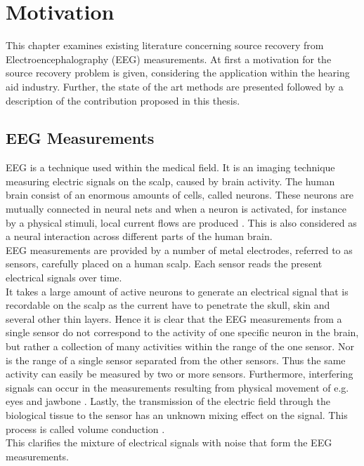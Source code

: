 \chapter{Motivation}\label{ch:motivation}
This chapter examines existing literature concerning source recovery from Electroencephalography (EEG) measurements. 
At first a motivation for the source recovery problem is given, considering the application within the hearing aid industry. 
Further, the state of the art methods are presented followed by a description of the contribution proposed in this thesis.

\section{EEG Measurements}\label{sec:EEG}
EEG is a technique used within the medical field. 
It is an imaging technique measuring electric signals on the scalp, caused by brain activity. 
The human brain consist of an enormous amounts of cells, called neurons. 
These neurons are mutually connected in neural nets and when a neuron is activated, for instance by a physical stimuli, local current flows are produced \cite{fundamentalEEG}. This is also considered as a neural interaction across different parts of the human brain.   
\\ 
EEG measurements are provided by a number of metal electrodes, referred to as sensors, carefully placed on a human scalp. 
Each sensor reads the present electrical signals over time.
\\
It takes a large amount of active neurons to generate an electrical signal that is recordable on the scalp as the current have to penetrate the skull, skin and several other thin layers.
Hence it is clear that the EEG measurements from a single sensor do not correspond to the activity of one specific neuron in the brain, but rather a collection of many activities within the range of the one sensor.
Nor is the range of a single sensor separated from the other sensors. Thus the same activity can easily be measured by two or more sensors.
Furthermore, interfering signals can occur in the measurements resulting from physical movement of e.g. eyes and jawbone \cite{fundamentalEEG}. 
Lastly, the transmission of the electric field through the biological tissue to the sensor has an unknown mixing effect on the signal. This process is called volume conduction \cite[p. 68]{EEGsignalprocessing} \cite{Van2019}.
\\
This clarifies the mixture of electrical signals with noise that form the EEG measurements. 
